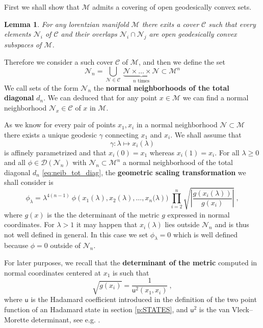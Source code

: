 \documentclass[11pt]{book}
\newcommand{\abs}[1]{\left|#1\right|}
\newcommand{\Ccal}{\mathcal{C}}
\newcommand{\Dcal}{\mathcal{D}}
\newcommand{\Mcal}{\mathcal{M}}
\newcommand{\Ncal}{\mathcal{N}}
\newcommand{\usf}{\mathsf{u}}
\theoremstyle{break}
\newtheorem{lemma}{Lemma}[chapter]
\begin{document}
First we shall show that $\Mcal$ admits a covering of open geodesically convex sets.


\begin{lemma}
For any lorentzian manifold $\Mcal$ there exits a cover $\Ccal$ such that every elements $\Ncal_i$ of $\Ccal$ and their overlaps $\Ncal_i \cap \Ncal_j$ are open geodesically convex subspaces of $\Mcal$.
\end{lemma}



Therefore we consider a such cover $\Ccal$ of $\Mcal$, and then we define the set
%
\begin{equation}
\Ncal_{n} = \bigcup_{\Ncal\in\Ccal} \ \underbrace{\Ncal \times \dots \times \Ncal}_{n \mbox{ times}} \subset \Mcal^n 
\label{eq:neib_tot_diag}
\end{equation}
%
We call sets of the form $\Ncal_n$ the \textbf{normal neighborhoods of the total diagonal} $d_n$. We can deduced that for any point $x \in \Mcal$ we can find a normal neighborhood $\Ncal_x \in \Ccal$ of $x$ in $\Mcal$. 


As we know for every pair of points $x_1,x_i$ in a normal neighborhood $\Ncal \subset \Mcal$ there exists a unique geodesic $\gamma$ connecting $x_1$ and $x_i$. We shall assume that
%
\begin{equation*}
\gamma : \lambda \mapsto x_i(\lambda) 
\end{equation*}
%
is affinely parametrized and that $x_i(0) =x_1$ whereas $x_i(1) = x_i$. For all $\lambda \geq 0$ and all $\phi \in \Dcal(\Ncal_n)$ with $\Ncal_n \subset \Mcal^n$ a normal neighborhood of the total diagonal $d_n$ \eqref{eq:neib_tot_diag}, the \textbf{geometric scaling transformation} we shall consider is
%
\begin{equation}
\phi_\lambda = \lambda^{4(n-1)} \ \phi\left(x_1(\lambda ),x_2(\lambda ),\dots,x_n(\lambda\right)) \ \prod_{i=2}^n \sqrt{\abs{\frac{g(x_i(\lambda ))}{g(x_i)}}} \ ,
\label{eq:geo_scaling_transfo}
\end{equation}
%
where $g(x)$ is the the determinant of the metric $g$ expressed in normal coordinates. For $\lambda > 1$ it may happen that $x_i(\lambda)$ lies outside $\Ncal_n$ and is thus not well defined in general. In this case we set $\phi_\lambda = 0$ which is well defined because $\phi = 0$ outside of $\Ncal_n$.


For later purposes, we recall that the \textbf{determinant of the metric} computed in normal coordinates centered at $x_1$ is such that
%
\begin{equation*}
\sqrt{g(x_i)} = \frac{1}{\usf^2(x_1,x_i)} \ , 
\end{equation*}
%
where $\usf$ is the Hadamard coefficient introduced in the definition of the two point function of an Hadamard state in section \ref{p:STATES}, and $\usf^2$ is the van Vleck--Morette determinant, see e.g. \cite{poisson_motion_2011}.
\end{document}

